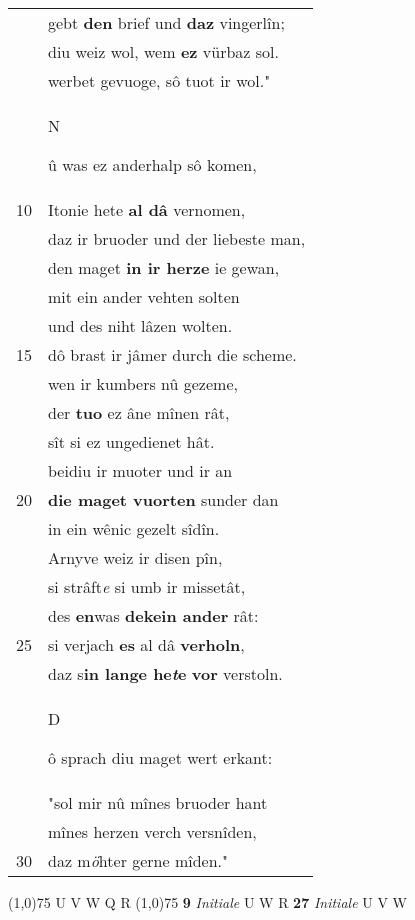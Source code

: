 \documentclass[8pt,a4paper,notitlepage]{article}
\begin{document}
\begin{table}[ht]
\begin{minipage}[t]{0.5\linewidth}
\begin{tabular}{rl}
 & gebt \textbf{den} brief und \textbf{daz} vingerlîn;\\ 
 & diu weiz wol, wem \textbf{ez} vürbaz sol.\\ 
 & werbet gevuoge, sô tuot ir wol."\\ 
 & \begin{large}N\end{large}û was ez anderhalp sô komen,\\ 
10 & Itonie hete \textbf{al dâ} vernomen,\\ 
 & daz ir bruoder und der liebeste man,\\ 
 & den maget \textbf{in ir herze} ie gewan,\\ 
 & mit ein ander vehten solten\\ 
 & und des niht lâzen wolten.\\ 
15 & dô brast ir jâmer durch die scheme.\\ 
 & wen ir kumbers nû gezeme,\\ 
 & der \textbf{tuo} ez âne mînen rât,\\ 
 & sît si ez ungedienet hât.\\ 
 & beidiu ir muoter und ir an\\ 
20 & \textbf{die maget vuorten} sunder dan\\ 
 & in ein wênic gezelt sîdîn.\\ 
 & Arnyve weiz ir disen pîn,\\ 
 & si strâft\textit{e} si umb ir missetât,\\ 
 & des \textbf{en}was \textbf{dekein ander} rât:\\ 
25 & si verjach \textbf{es} al dâ \textbf{verholn},\\ 
 & daz s\textbf{in lange he\textit{t}e} \textbf{vor} verstoln.\\ 
 & \begin{large}D\end{large}ô sprach diu maget wert erkant:\\ 
 & "sol mir nû mînes bruoder hant\\ 
 & mînes herzen verch versnîden,\\ 
30 & daz m\textit{ö}hter gerne mîden."\\ 
\end{tabular}
\scriptsize
\line(1,0){75} \newline
U V W Q R \newline
\line(1,0){75} \newline
\textbf{9} \textit{Initiale} U W R  \textbf{27} \textit{Initiale} U V W  \newline

\end{minipage}
\end{table}
\end{document}

